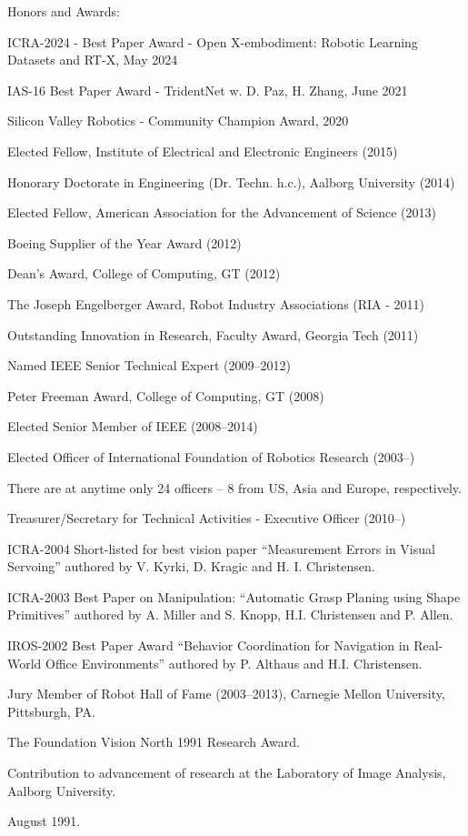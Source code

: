 \documentclass{article}
\newenvironment{sublist}{%
  \begin{list}{}{%
      \setlength{\itemsep}{0em}\setlength{\parsep}{0em}%
      \setlength{\topsep}{0em}\setlength{\parskip}{0em}%
    }%
}%
{ \end{list} }
\begin{document}
\begin{cv}
	\begin{cvlist}{Honors and Awards:}
		\item ICRA-2024 - Best Paper Award - Open X-embodiment: Robotic Learning Datasets and RT-X, May 2024
		\item IAS-16 Best Paper Award - TridentNet w. D. Paz, H. Zhang, June 2021
		\item Silicon Valley Robotics - Community Champion Award, 2020
		\item Elected Fellow, Institute of Electrical and Electronic Engineers (2015)
		\item Honorary Doctorate in Engineering (Dr. Techn. h.c.), Aalborg University (2014)
		\item Elected Fellow, American Association for the Advancement of Science (2013)
		\item Boeing Supplier of the Year Award (2012)
		\item Dean's Award, College of Computing, GT (2012)
		\item The Joseph Engelberger Award, Robot Industry Associations (RIA - 2011)
		\item Outstanding Innovation in Research, Faculty Award, Georgia Tech (2011)
		\item Named IEEE Senior Technical Expert (2009--2012)
		\item Peter Freeman Award, College of Computing, GT (2008)
		\item Elected Senior Member of IEEE (2008--2014)
		\item Elected Officer of International Foundation of Robotics Research
		(2003--)
		\begin{sublist}
			\item There are at anytime only 24 officers -- 8 from US, Asia and Europe,
			respectively.
			\item Treasurer/Secretary for Technical Activities - Executive
			Officer (2010--)
		\end{sublist}
		\item ICRA-2004 Short-listed for best vision paper ``Measurement
		Errors in Visual Servoing'' authored by V. Kyrki, D. Kragic and H.
		I. Christensen.
		\item ICRA-2003 Best Paper on Manipulation:  ``Automatic
		Grasp Planing using Shape Primitives'' authored by A. Miller and
		S. Knopp, H.I. Christensen and P. Allen.
		\item IROS-2002 Best Paper Award ``Behavior Coordination for
		Navigation in Real-World Office Environments'' authored by
		P. Althaus and H.I. Christensen.
		\item Jury Member of Robot Hall of Fame (2003--2013), Carnegie Mellon
		University, Pittsburgh, PA.
		\item The Foundation Vision North 1991 Research Award.
		\begin{sublist}
			\item Contribution to advancement of research at the Laboratory of
			Image Analysis, Aalborg University.
			\item August 1991.
		\end{sublist}
	\end{cvlist}
\end{cv}
\end{document}
